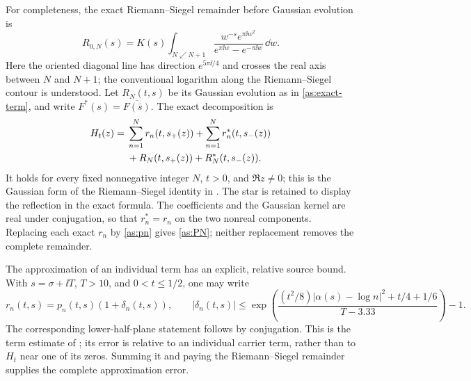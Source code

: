 For completeness, the exact Riemann--Siegel remainder before Gaussian
evolution is
\begin{equation}
 R_{0,N}(s)=K(s)\int_{N\swarrow N+1}
       \frac{w^{-s}e^{\pi\ii w^2}}
            {e^{\pi\ii w}-e^{-\pi\ii w}}\,\dd w.
 \label{as:exact-RS-remainder}
\end{equation}
Here the oriented diagonal line has direction $e^{5\pi\ii/4}$ and
crosses the real axis between $N$ and $N+1$; the conventional logarithm
along the Riemann--Siegel contour is understood.  Let $R_N(t,s)$ be its
Gaussian evolution as in \eqref{as:exact-term}, and write
$F^*(s)=\overline{F(\overline s)}$.  The exact decomposition is
\begin{align}
 H_t(z)={}&\sum_{n=1}^N r_n(t,s_+(z))
        +\sum_{n=1}^N r_n^*(t,s_-(z))\notag\\
        &+R_N(t,s_+(z))+R_N^*(t,s_-(z)).
 \label{as:exact-finite-expansion}
\end{align}
It holds for every fixed nonnegative integer $N$, $t>0$, and
$\Re z\ne0$; this is the Gaussian form of the Riemann--Siegel identity
in \cite[\S4]{Polymath2019}.  The star is retained to display the
reflection in the exact formula.  The coefficients and the Gaussian
kernel are real under conjugation, so that $r_n^*=r_n$ on the two
nonreal components.  Replacing each exact $r_n$ by \eqref{as:pn} gives
\eqref{as:PN}; neither replacement removes the complete remainder.

The approximation of an individual term has an explicit, relative
source bound.  With $s=\sigma+\ii T$, $T>10$, and $0<t\le1/2$, one may
write
\begin{equation}
 r_n(t,s)=p_n(t,s)(1+\delta_n(t,s)),\qquad
 |\delta_n(t,s)|\le
 \exp\left(
 \frac{(t^2/8)|\alpha(s)-\log n|^2+t/4+1/6}{T-3.33}
 \right)-1.
 \label{as:term-source-bound}
\end{equation}
The corresponding lower-half-plane statement follows by conjugation.
This is the term estimate of \cite[Proposition 6.1]{Polymath2019}; its
error is relative to an individual carrier term, rather than to $H_t$
near one of its zeros.  Summing it and paying the Riemann--Siegel
remainder supplies the complete approximation error.


